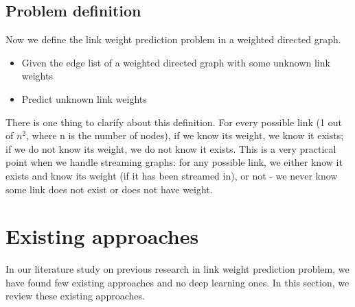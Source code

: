\documentclass[conference]{IEEEtran}
\begin{document}
\subsection{Problem definition}
Now we define the link weight prediction problem in a weighted directed graph.
\begin{itemize}
	\item Given the edge list of a weighted directed graph with some unknown link weights
	\item Predict unknown link weights
\end{itemize}
There is one thing to clarify about this definition.
For every possible link (1 out of $ n^2 $, where n is the number of nodes), 
if we know its weight, we know it exists;
if we do not know its weight, we do not know it exists.
This is a very practical point when we handle streaming graphs:
for any possible link,
we either know it exists and know its weight (if it has been streamed in), or not - we never know some link does not exist or does not have weight.

\section{Existing approaches}
In our literature study on previous research in link weight prediction problem,
we have found few existing approaches and no deep learning ones.
In this section,
we review these existing approaches.
\end{document}
